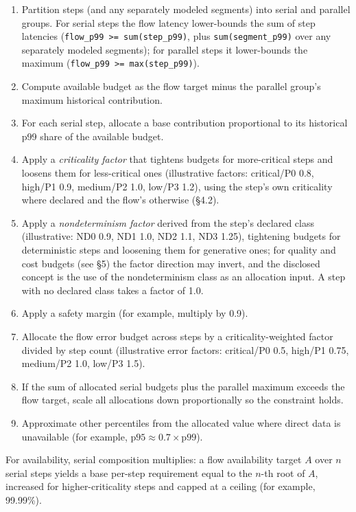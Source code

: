 \documentclass[11pt]{article}
\newcommand{\code}[1]{\texttt{#1}}
\begin{document}
\begin{enumerate}[label=\arabic*.]
\item Partition steps (and any separately modeled segments) into serial and parallel groups. For serial steps the flow latency lower-bounds the sum of step latencies (\code{flow\_p99 \textgreater{}= sum(step\_p99)}, plus \code{sum(segment\_p99)} over any separately modeled segments); for parallel steps it lower-bounds the maximum (\code{flow\_p99 \textgreater{}= max(step\_p99)}).
\item Compute available budget as the flow target minus the parallel group's maximum historical contribution.
\item For each serial step, allocate a base contribution proportional to its historical p99 share of the available budget.
\item Apply a \emph{criticality factor} that tightens budgets for more-critical steps and loosens them for less-critical ones (illustrative factors: critical/P0 0.8, high/P1 0.9, medium/P2 1.0, low/P3 1.2), using the step's own criticality where declared and the flow's otherwise (\S4.2).
\item[4b.] Apply a \emph{nondeterminism factor} derived from the step's declared class (illustrative: ND0 0.9, ND1 1.0, ND2 1.1, ND3 1.25), tightening budgets for deterministic steps and loosening them for generative ones; for quality and cost budgets (see \S5) the factor direction may invert, and the disclosed concept is the use of the nondeterminism class as an allocation input. A step with no declared class takes a factor of 1.0.
\item Apply a safety margin (for example, multiply by 0.9).
\item Allocate the flow error budget across steps by a criticality-weighted factor divided by step count (illustrative error factors: critical/P0 0.5, high/P1 0.75, medium/P2 1.0, low/P3 1.5).
\item If the sum of allocated serial budgets plus the parallel maximum exceeds the flow target, scale all allocations down proportionally so the constraint holds.
\item Approximate other percentiles from the allocated value where direct data is unavailable (for example, \(\mathrm{p95} \approx 0.7 \times \mathrm{p99}\)).
\end{enumerate}

For availability, serial composition multiplies: a flow availability target \(A\) over \(n\) serial steps yields a base per-step requirement equal to the \(n\)-th root of \(A\), increased for higher-criticality steps and capped at a ceiling (for example, 99.99\%).
\end{document}
